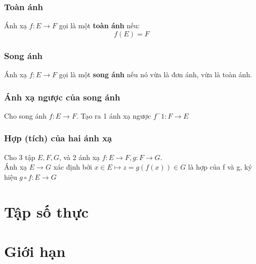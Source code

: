 \documentclass[12pt]{report}
\begin{document}
        \subsection{Toàn ánh}
            Ánh xạ $f : E \rightarrow F$ gọi là một \textbf{toàn ánh} nếu:
            $$f(E) = F$$
        
        \subsection{Song ánh}
            Ánh xạ $f : E \rightarrow F$ gọi là một \textbf{song ánh} nếu
            nó vừa là đơn ánh, vừa là toàn ánh.

        \subsection{Ánh xạ ngược của song ánh}
            Cho song ánh $f : E \rightarrow F$. Tạo ra 1 ánh xạ ngược $f^-1: F \rightarrow E$ 
            
        \subsection{Hợp (tích) của hai ánh xạ}
            Cho 3 tập $E, F, G$, và 2 ánh xạ $f: E \rightarrow F, g: F \rightarrow G$.\\
            Ánh xạ $E \rightarrow G$ xác định bởi $x \in E \mapsto z = g(f(x)) \in G$ là hợp 
            của f và g, ký hiệu $g \circ f: E \rightarrow G$
        
\chapter{\centering Tập số thực}

\chapter{\centering Giới hạn}
\end{document}
